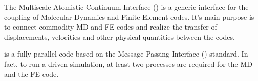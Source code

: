 
The Multiscale Atomistic Continuum Interface (\MACI) is a generic \CPP 
interface for the coupling of Molecular Dynamics and Finite Element codes.
It's main purpose is to connect commodity MD and FE codes and realize
the transfer of displacements, velocities and other physical quantities
between the codes.

\MACI is a fully parallel code based on the Message Passing Interface (\MPI) 
standard. In fact, to run a \MACI driven simulation, at least two \MPI 
processes are required for the MD and the FE code. 

